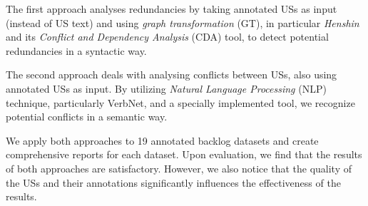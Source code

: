 The first approach analyses redundancies by taking annotated USs as input (instead of US text) and using \textit{graph transformation} (GT), in particular \textit{Henshin} and its \textit{Conflict and Dependency Analysis} (CDA) tool, to detect potential redundancies in a syntactic way.

The second approach deals with analysing conflicts between USs, also using annotated USs as input. By utilizing \textit{Natural Language Processing} (NLP) technique, particularly VerbNet, and a specially implemented tool, we recognize potential conflicts in a semantic way.

We apply both approaches to 19 annotated backlog datasets and create comprehensive reports for each dataset. Upon evaluation, we find that the results of both approaches are satisfactory. However, we also notice that the quality of the USs and their annotations significantly influences the effectiveness of the results.
